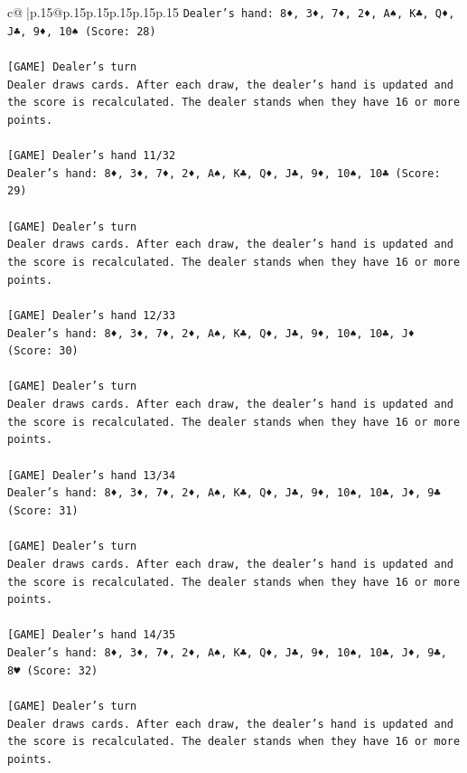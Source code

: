 \documentclass{article}
\begin{document}
{\begin{supertabular}{c@{$\;$}|p{.15\linewidth}@{}p{.15\linewidth}p{.15\linewidth}p{.15\linewidth}p{.15\linewidth}p{.15\linewidth}}
{{{\texttt{Dealer's hand: 8♦, 3♦, 7♦, 2♦, A♠, K♣, Q♦, J♣, 9♦, 10♠ (Score: 28)} \\
\\ 
\texttt{{[}GAME{]} Dealer's turn} \\
\texttt{Dealer draws cards. After each draw, the dealer's hand is updated and the score is recalculated. The dealer stands when they have 16 or more points.} \\
\\ 
\texttt{{[}GAME{]} Dealer's hand 11/32} \\
\texttt{Dealer's hand: 8♦, 3♦, 7♦, 2♦, A♠, K♣, Q♦, J♣, 9♦, 10♠, 10♣ (Score: 29)} \\
\\ 
\texttt{{[}GAME{]} Dealer's turn} \\
\texttt{Dealer draws cards. After each draw, the dealer's hand is updated and the score is recalculated. The dealer stands when they have 16 or more points.} \\
\\ 
\texttt{{[}GAME{]} Dealer's hand 12/33} \\
\texttt{Dealer's hand: 8♦, 3♦, 7♦, 2♦, A♠, K♣, Q♦, J♣, 9♦, 10♠, 10♣, J♦ (Score: 30)} \\
\\ 
\texttt{{[}GAME{]} Dealer's turn} \\
\texttt{Dealer draws cards. After each draw, the dealer's hand is updated and the score is recalculated. The dealer stands when they have 16 or more points.} \\
\\ 
\texttt{{[}GAME{]} Dealer's hand 13/34} \\
\texttt{Dealer's hand: 8♦, 3♦, 7♦, 2♦, A♠, K♣, Q♦, J♣, 9♦, 10♠, 10♣, J♦, 9♣ (Score: 31)} \\
\\ 
\texttt{{[}GAME{]} Dealer's turn} \\
\texttt{Dealer draws cards. After each draw, the dealer's hand is updated and the score is recalculated. The dealer stands when they have 16 or more points.} \\
\\ 
\texttt{{[}GAME{]} Dealer's hand 14/35} \\
\texttt{Dealer's hand: 8♦, 3♦, 7♦, 2♦, A♠, K♣, Q♦, J♣, 9♦, 10♠, 10♣, J♦, 9♣, 8♥ (Score: 32)} \\
\\ 
\texttt{{[}GAME{]} Dealer's turn} \\
\texttt{Dealer draws cards. After each draw, the dealer's hand is updated and the score is recalculated. The dealer stands when they have 16 or more points.} \\
}}}
\end{supertabular}}
\end{document}
